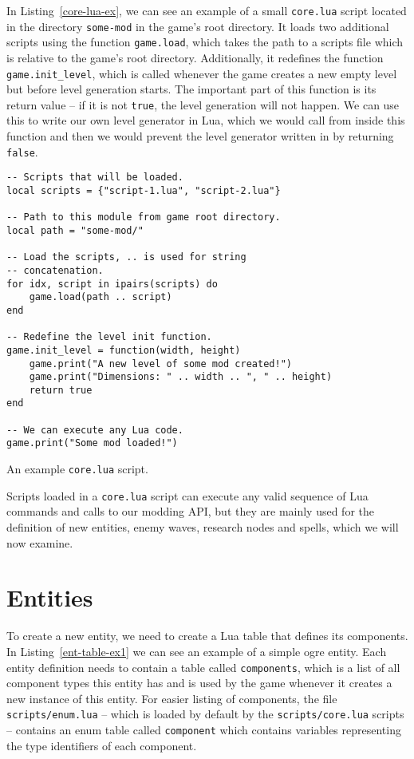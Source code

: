 In Listing~\ref{core-lua-ex}, we can see an example of a small \texttt{core.lua} script located in the directory \texttt{some-mod}
in the game's root directory. It loads two additional scripts using the function \texttt{game.load}, which takes the path
to a scripts file which is relative to the game's root directory. Additionally, it redefines the function \texttt{game.init\_level},
which is called whenever the game creates a new empty level but before level generation starts. The important part of this function
is its return value -- if it is not \texttt{true}, the level generation will not happen. We can use this to write our own level
generator in Lua, which we would call from inside this function and then we would prevent the level generator written in \cpp by
returning \texttt{false}.

\begin{listing}[H]
    \centering
    \begin{lstlisting}
-- Scripts that will be loaded.
local scripts = {"script-1.lua", "script-2.lua"}

-- Path to this module from game root directory.
local path = "some-mod/"

-- Load the scripts, .. is used for string
-- concatenation.
for idx, script in ipairs(scripts) do
    game.load(path .. script)
end

-- Redefine the level init function.
game.init_level = function(width, height)
    game.print("A new level of some mod created!")
    game.print("Dimensions: " .. width .. ", " .. height)
    return true
end

-- We can execute any Lua code.
game.print("Some mod loaded!")
    \end{lstlisting}
    \caption{An example \texttt{core.lua} script.}
    \label{core-lua-ex}
\end{listing}

Scripts loaded in a \texttt{core.lua} script can execute any valid sequence of Lua commands and calls to our modding API, but they
are mainly used for the definition of new entities, enemy waves, research nodes and spells, which we will now examine.

\section{Entities}

To create a new entity, we need to create a Lua table that defines its components. In Listing~\ref{ent-table-ex1} we can see an example
of a simple ogre entity. Each entity definition needs to contain a table called \texttt{components}, which is a list of all component
types this entity has and is used by the game whenever it creates a new instance of this entity. For easier listing of components, the
file \texttt{scripts/enum.lua} -- which is loaded by default by the \texttt{scripts/core.lua} scripts -- contains an enum table called
\texttt{component} which contains variables representing the type identifiers of each component.

